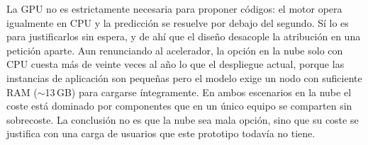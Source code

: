 La GPU no es estrictamente necesaria para proponer códigos: el motor opera igualmente en CPU y la predicción se resuelve por debajo del segundo. Sí lo es para justificarlos sin espera, y de ahí que el diseño desacople la atribución en una petición aparte. Aun renunciando al acelerador, la opción en la nube solo con CPU cuesta más de veinte veces al año lo que el despliegue actual, porque las instancias de aplicación son pequeñas pero el modelo exige un nodo con suficiente RAM ($\sim$13\,GB) para cargarse íntegramente. En ambos escenarios en la nube el coste está dominado por componentes que en un único equipo se comparten sin sobrecoste. La conclusión no es que la nube sea mala opción, sino que su coste se justifica con una carga de usuarios que este prototipo todavía no tiene.
